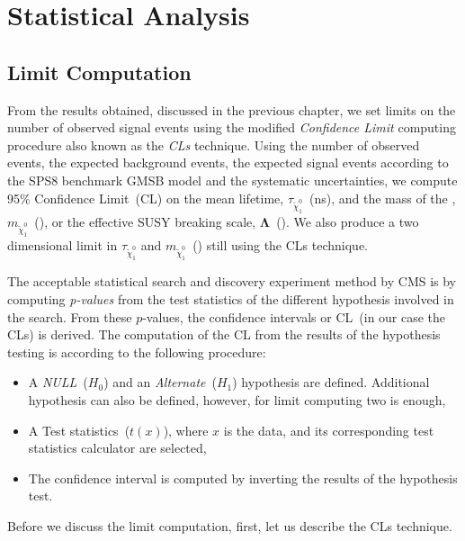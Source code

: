 \chapter{Statistical Analysis}
\label{Limit_Setting}


\section{Limit Computation}
From the results obtained, discussed in the previous chapter, we set limits on the number of observed signal events using the modified \textit{Confidence Limit} computing procedure also known as the \textit{CLs} technique. Using the number of observed events, the expected background events, the expected signal events according to the SPS8 benchmark GMSB model and the systematic uncertainties, we compute 95\% Confidence Limit~(CL) on the mean lifetime, $\tau_{\tilde{\chi}^{0}_{1}}$~(ns), and the mass of the  \PSneutralinoOne, $m_{\tilde{\chi}^{0}_{1}}$~(\GeVcc),  or the effective SUSY breaking scale, $\mathbf{\Lambda}$~(\TeV). We also produce a two dimensional limit in $\tau_{\tilde{\chi}^{0}_{1}}$ and $m_{\tilde{\chi}^{0}_{1}}$~(\GeVcc) still using the CLs technique.
\par 
The acceptable statistical search and discovery experiment method by CMS is by computing \textit{p-values} from the test statistics of the different hypothesis involved in the search. From these $p$-values, the confidence intervals or CL~(in our case the CLs) is derived. The computation of the CL from the results of the hypothesis testing is according to the following procedure:
\begin{itemize}
\item A \textit{NULL}~($H_{0}$) and an \textit{Alternate}~($H_{1}$) hypothesis are defined. Additional hypothesis can also be defined, however, for limit computing two is enough,
\item A Test statistics~($t(x)$), where $x$ is the data, and its corresponding test statistics calculator are selected,
\item The confidence interval is computed by inverting the results of the hypothesis test.
\end{itemize}
Before we discuss the limit computation, first, let us describe the CLs technique.
